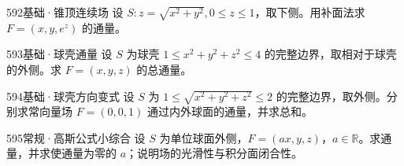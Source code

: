 \begin{exercise}{592}{基础·锥顶连续场}
设 $S:z=\sqrt{x^2+y^2},0\leq z\leq1$，取下侧。用补面法求 $F=(x,y,e^z)$ 的通量。
\end{exercise}
\begin{exercise}{593}{基础·球壳通量}
设 $S$ 为球壳 $1\leq x^2+y^2+z^2\leq4$ 的完整边界，取相对于球壳的外侧。求 $F=(x,y,z)$ 的总通量。
\end{exercise}
\begin{exercise}{594}{基础·球壳方向变式}
设 $S$ 为 $1\leq\sqrt{x^2+y^2+z^2}\leq2$ 的完整边界，取外侧。分别求常向量场 $F=(0,0,1)$ 通过内外球面的通量，并求总和。
\end{exercise}
\begin{exercise}{595}{常规·高斯公式小综合}
设 $S$ 为单位球面外侧，$F=(ax,y,z)$，$a\in\mathbb R$。求通量，并求使通量为零的 $a$；说明场的光滑性与积分面闭合性。
\end{exercise}
